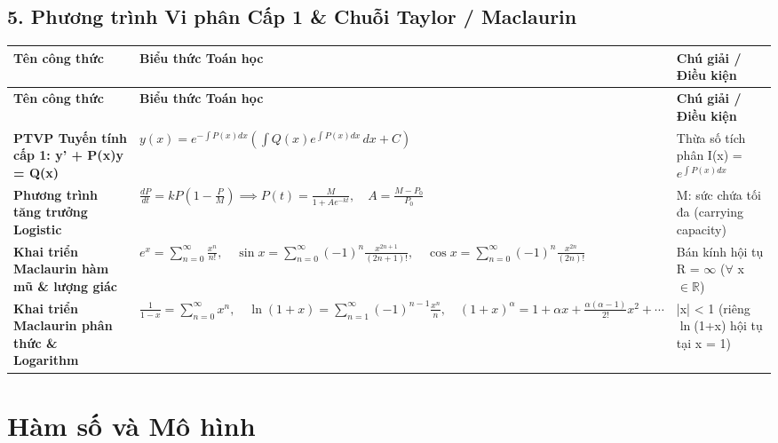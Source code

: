 \documentclass[11pt,a4paper,oneside]{book}
\begin{document}
\section*{5. Phương trình Vi phân Cấp 1 \& Chuỗi Taylor / Maclaurin}
\begin{longtable}{|p{}|p{}|p{}|}
\hline
\rowcolor{blue!10} \textbf{Tên công thức} & \textbf{Biểu thức Toán học} & \textbf{Chú giải / Điều kiện} \\ \hline
\endfirsthead
\hline
\rowcolor{blue!10} \textbf{Tên công thức} & \textbf{Biểu thức Toán học} & \textbf{Chú giải / Điều kiện} \\ \hline
\endhead
\textbf{PTVP Tuyến tính cấp 1: y' + P(x)y = Q(x)} & $\displaystyle y(x) = e^{-\int P(x)dx} \left( \int Q(x) e^{\int P(x)dx}\,dx + C \right)$ & Thừa số tích phân I(x) = $e^{\int P(x)dx}$ \\ \hline
\textbf{Phương trình tăng trưởng Logistic} & $\displaystyle \frac{dP}{dt} = kP\left(1 - \frac{P}{M}\right) \implies P(t) = \frac{M}{1 + A e^{-kt}}, \quad A = \frac{M - P_0}{P_0}$ & M: sức chứa tối đa (carrying capacity) \\ \hline
\textbf{Khai triển Maclaurin hàm mũ \& lượng giác} & $\displaystyle e^x = \sum_{n=0}^\infty \frac{x^n}{n!}, \quad \sin x = \sum_{n=0}^\infty (-1)^n \frac{x^{2n+1}}{(2n+1)!}, \quad \cos x = \sum_{n=0}^\infty (-1)^n \frac{x^{2n}}{(2n)!}$ & Bán kính hội tụ R = $\infty$ ($\forall$ x $\in \mathbb{R}$) \\ \hline
\textbf{Khai triển Maclaurin phân thức \& Logarithm} & $\displaystyle \frac{1}{1-x} = \sum_{n=0}^\infty x^n, \quad \ln(1+x) = \sum_{n=1}^\infty (-1)^{n-1}\frac{x^n}{n}, \quad (1+x)^\alpha = 1 + \alpha x + \frac{\alpha(\alpha-1)}{2!}x^2 + \cdots$ & |x| < 1 (riêng $\ln$(1+x) hội tụ tại x = 1) \\ \hline
\end{longtable}

\chapter{Hàm số và Mô hình}
\label{chap:chuong-1}
\end{document}

